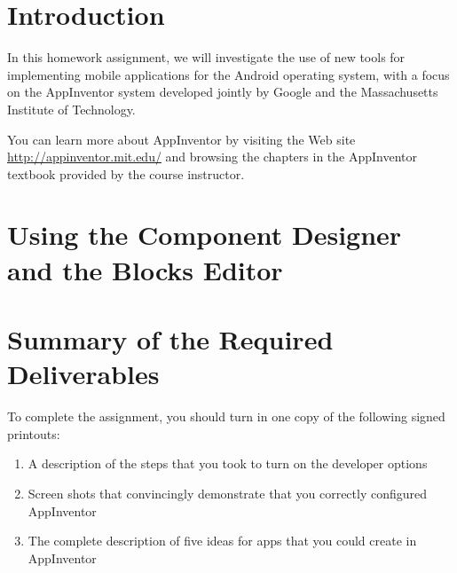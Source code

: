 	

\usepackage[compact]{titlesec}



\vspace*{-.1in}
\section*{Introduction}

In this homework assignment, we will investigate the use of new tools for implementing mobile applications for the
Android operating system, with a focus on the AppInventor system developed jointly by Google and the
Massachusetts Institute of Technology.  

You can learn more about AppInventor by visiting the Web site
\url{http://appinventor.mit.edu/} and browsing the chapters in the AppInventor textbook provided by the course
instructor.

\section*{Using the Component Designer and the Blocks Editor}

\section*{Summary of the Required Deliverables}

\noindent
To complete the assignment, you should turn in one copy of the following signed printouts: 
\vspace*{-.1in}

\begin{enumerate}
	\itemsep0em
	\item A description of the steps that you took to turn on the developer options
	\item Screen shots that convincingly demonstrate that you correctly configured AppInventor
	\item The complete description of five ideas for apps that you could create in AppInventor
\end{enumerate}

